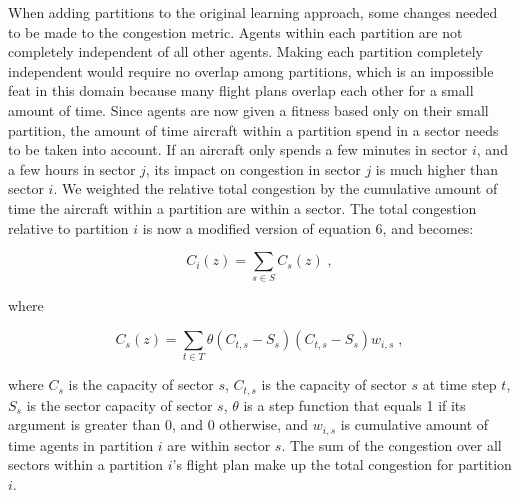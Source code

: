 \documentclass{sig-alternate}
\begin{document}
When adding partitions to the original learning approach, some changes needed to be made to the congestion metric. Agents within each partition are not completely independent of all other agents. Making each partition completely independent would require no overlap among partitions, which is an impossible feat in this domain because many flight plans overlap each other for a small amount of time. Since agents are now given a fitness based only on their small partition, the amount of time aircraft within a partition spend in a sector needs to be taken into account. If an aircraft only spends a few minutes in sector $i$, and a few hours in sector $j$, its impact on congestion in sector $j$ is much higher than sector $i$. We weighted the relative total congestion by the cumulative amount of time the aircraft within a partition are within a sector. The total congestion relative to partition $i$ is now a modified version of equation 6, and becomes:

\begin{equation}
C_i(z) = \displaystyle\sum\limits_{s \in S} C_s(z)\;,
\end{equation}

where

\begin{equation}
C_s(z) = \displaystyle\sum\limits_{t \in T} \theta(C_{t,s} - S_s) (C_{t,s} - S_s) w_{i,s}\;,
\end{equation}

where $C_s$ is the capacity of sector $s$, $C_{t,s}$ is the capacity of sector $s$ at time step $t$, $S_s$ is the sector capacity of sector $s$, $\theta$ is a step function that equals 1 if its argument is greater than 0, and 0 otherwise, and $w_{i,s}$ is cumulative amount of time agents in partition $i$ are within sector $s$. The sum of the congestion over all sectors within a partition $i$'s flight plan make up the total congestion for partition $i$.
\end{document}
